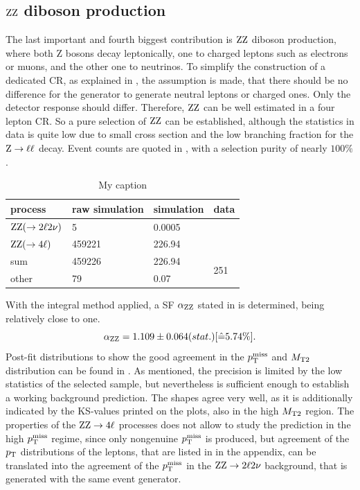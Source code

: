 \subsection{$\mathrm{Z}\mathrm{Z}$ diboson production}
The last important and fourth biggest contribution is $\mathrm{Z}\mathrm{Z}$ diboson production, where both Z bosons decay leptonically, one to charged leptons such as electrons or muons, and the other one to neutrinos. To simplify the construction of a dedicated CR, as explained in , the assumption is made, that there should be no difference for the generator to generate neutral leptons or charged ones. Only the detector response should differ. Therefore, $\mathrm{Z}\mathrm{Z}$ can be well estimated in a four lepton CR. So a pure selection of $\mathrm{Z}\mathrm{Z}$ can be established, although the statistics in data is quite low due to small cross section and the low branching fraction for the $\mathrm{Z}\to\ell\ell$ decay. Event counts are quoted in , with a selection purity of nearly $100\%$.
\begin{table}[tbp]
 \centering
 \caption{My caption}
 \label{tab:CRZZ}
 \begin{tabular}{llll}
  
  process                 & raw simulation & simulation & data                 \\\hline
  $\mathrm{Z}\mathrm{Z}(\to2\ell2\nu)$ & 5              & 0.0005     &                      \\
  $\mathrm{Z}\mathrm{Z}(\to4\ell)$      & 459221         & 226.94     &                      \\\hline\hline
  sum                     & 459226         & 226.94     & \multirow{2}{*}{251} \\
  other                   & 79             & 0.07       &                      
 \end{tabular}
\end{table}
With the integral method applied, a SF $\alpha_{\mathrm{Z}\mathrm{Z}}$ stated in  is determined, being relatively close to one.
\begin{equation}\label{eq:AlphaZZ}
 \alpha_{\mathrm{Z}\mathrm{Z}}=1.109 \pm 0.064 (stat.) [\hat{=}5.74\%].
\end{equation}
Post-fit distributions to show the good agreement in the $p_{\mathrm{T}}^\text{miss}$ and $M_{\mathrm{T2}}$ distribution can be found in . As mentioned, the precision is limited by the low statistics of the selected sample, but nevertheless is sufficient enough to establish a working background prediction. The shapes agree very well, as it is additionally indicated by the KS-values printed on the plots, also in the high $M_{\mathrm{T2}}$ region. The properties of the $\mathrm{Z}\mathrm{Z}\to4\ell$ processes does not allow to study the prediction in the high $p_{\mathrm{T}}^\text{miss}$ regime, since only nongenuine $p_{\mathrm{T}}^\text{miss}$ is produced, but agreement of the $p_{\mathrm{T}}$ distributions of the leptons, that are listed in  in the appendix, can be translated into the agreement of the $p_{\mathrm{T}}^\text{miss}$ in the $\mathrm{Z}\mathrm{Z}\to2\ell2\nu$ background, that is generated with the same event generator.
